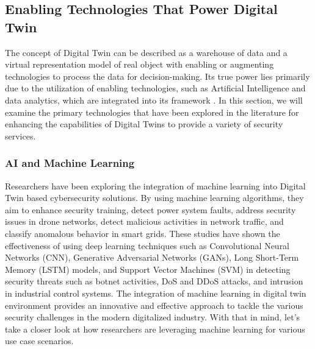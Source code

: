 
%
\subsection{Enabling Technologies That Power Digital Twin}

The concept of Digital Twin can be described as a warehouse of data and a virtual representation model of real object with enabling or augmenting technologies to process the data for decision-making. Its true power lies primarily due to the utilization of enabling technologies, such as Artificial Intelligence and data analytics, which are integrated into its framework \cite{sousaELEGANTSecurityCritical2021}. In this section, we will examine the primary technologies that have been explored in the literature for enhancing the capabilities of Digital Twins to provide a variety of security services.



\subsubsection{AI and Machine Learning}
Researchers have been exploring the integration of machine learning into Digital Twin based cybersecurity solutions. By using machine learning algorithms, they aim to enhance security training, detect power system faults, address security issues in drone networks, detect malicious activities in network traffic, and classify anomalous behavior in smart grids. These studies have shown the effectiveness of using deep learning techniques such as Convolutional Neural Networks (CNN), Generative Adversarial Networks (GANs), Long Short-Term Memory (LSTM) models, and Support Vector Machines (SVM) in detecting security threats such as botnet activities, DoS and DDoS attacks, and intrusion in industrial control systems. The integration of machine learning in digital twin environment provides an innovative and effective approach to tackle the various security challenges in the modern digitalized industry. With that in mind, let's take a closer look at how researchers are leveraging machine learning for various use case scenarios.  

